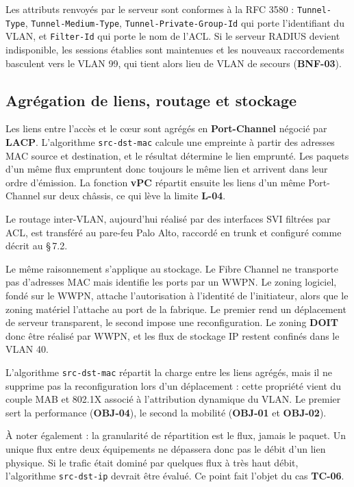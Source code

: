 \documentclass[11pt,a4paper]{article}
\newcommand{\ttb}[1]{\texttt{\small #1}}
\newcommand{\rid}[1]{\textcolor{primary}{\textbf{\small #1}}}
\begin{document}
Les attributs renvoyés par le serveur sont conformes à la RFC 3580 : \ttb{Tunnel-Type}, \ttb{Tunnel-Medium-Type}, \ttb{Tunnel-Private-Group-Id} qui porte l'identifiant du VLAN, et \ttb{Filter-Id} qui porte le nom de l'ACL. Si le serveur RADIUS devient indisponible, les sessions établies sont maintenues et les nouveaux raccordements basculent vers le VLAN 99, qui tient alors lieu de VLAN de secours (\rid{BNF-03}).

\subsection{Agrégation de liens, routage et stockage}
Les liens entre l'accès et le cœur sont agrégés en \textbf{Port-Channel} négocié par \textbf{LACP}. L'algorithme \ttb{src-dst-mac} calcule une empreinte à partir des adresses MAC source et destination, et le résultat détermine le lien emprunté. Les paquets d'un même flux empruntent donc toujours le même lien et arrivent dans leur ordre d'émission. La fonction \textbf{vPC} répartit ensuite les liens d'un même Port-Channel sur deux châssis, ce qui lève la limite \rid{L-04}.

Le routage inter-VLAN, aujourd'hui réalisé par des interfaces SVI filtrées par ACL, est transféré au pare-feu Palo Alto, raccordé en trunk et configuré comme décrit au \S\,7.2.

Le même raisonnement s'applique au stockage. Le Fibre Channel ne transporte pas d'adresses MAC mais identifie les ports par un WWPN. Le zoning logiciel, fondé sur le WWPN, attache l'autorisation à l'identité de l'initiateur, alors que le zoning matériel l'attache au port de la fabrique. Le premier rend un déplacement de serveur transparent, le second impose une reconfiguration. Le zoning \textbf{DOIT} donc être réalisé par WWPN, et les flux de stockage IP restent confinés dans le VLAN 40.

\begin{notebox}
L'algorithme \ttb{src-dst-mac} répartit la charge entre les liens agrégés, mais il ne supprime pas la reconfiguration lors d'un déplacement : cette propriété vient du couple MAB et 802.1X associé à l'attribution dynamique du VLAN. Le premier sert la performance (\rid{OBJ-04}), le second la mobilité (\rid{OBJ-01} et \rid{OBJ-02}).

À noter également : la granularité de répartition est le flux, jamais le paquet. Un unique flux entre deux équipements ne dépassera donc pas le débit d'un lien physique. Si le trafic était dominé par quelques flux à très haut débit, l'algorithme \ttb{src-dst-ip} devrait être évalué. Ce point fait l'objet du cas \rid{TC-06}.
\end{notebox}
\end{document}

